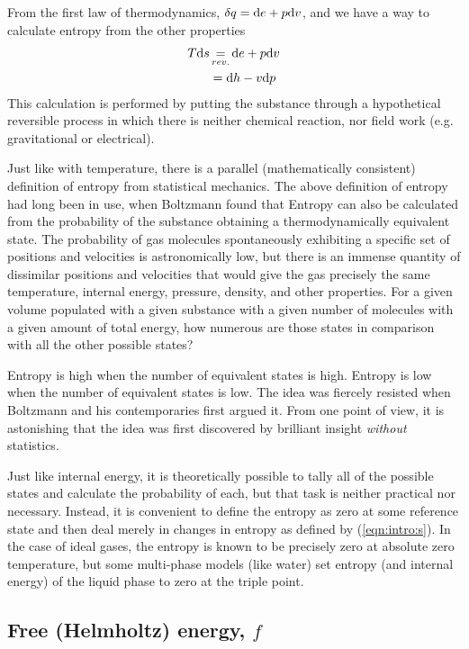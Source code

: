 From the first law of thermodynamics, $\delta q = \mathrm{d} e + p \mathrm{d} v$, and we have a way to calculate entropy from the other properties
\begin{align}
T \mathrm{d} s &\operatorname*{=}_{rev.} \mathrm{d} e + p\mathrm{d} v\label{eqn:intro:ds1}\\
 &= \mathrm{d} h - v \mathrm{d} p\label{eqn:intro:ds2}
\end{align}
This calculation is performed by putting the substance through a hypothetical reversible process in which there is neither chemical reaction, nor field work (e.g. gravitational or electrical).

Just like with temperature, there is a parallel (mathematically consistent) definition of entropy from statistical mechanics.  The above definition of entropy had long been in use, when Boltzmann found that Entropy can also be calculated from the probability of the substance obtaining a thermodynamically equivalent state.  The probability of gas molecules spontaneously exhibiting a specific set of positions and velocities is astronomically low, but there is an immense quantity of dissimilar positions and velocities that would give the gas precisely the same temperature, internal energy, pressure, density, and other properties.  For a given volume populated with a given substance with a given number of molecules with a given amount of total energy, how numerous are those states in comparison with all the other possible states?

Entropy is high when the number of equivalent states is high.  Entropy is low when the number of equivalent states is low.  The idea was fiercely resisted when Boltzmann and his contemporaries first argued it.  From one point of view, it is astonishing that the idea was first discovered by brilliant insight \emph{without} statistics.

Just like internal energy, it is theoretically possible to tally all of the possible states and calculate the probability of each, but that task is neither practical nor necessary.  Instead, it is convenient to define the entropy as zero at some reference state and then deal merely in changes in entropy as defined by (\ref{eqn:intro:s}).  In the case of ideal gases, the entropy is known to be precisely zero at absolute zero temperature, but some multi-phase models (like water) set entropy (and internal energy) of the liquid phase to zero at the triple point.

\subsection{Free (Helmholtz) energy, $f$}\label{sec:intro:f}

